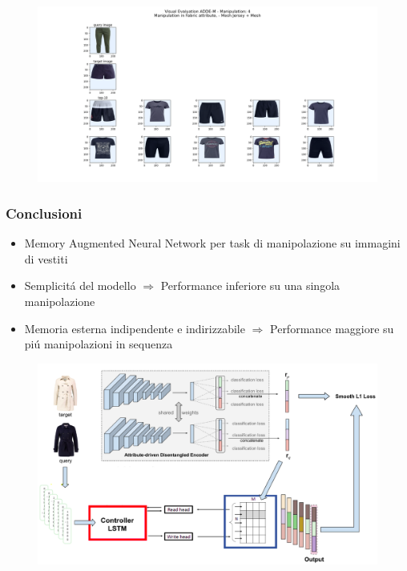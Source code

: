 \documentclass{beamer}
\begin{document}
\begin{frame}
\begin{itemize}
\begin{figure}[!h]
\begin{center}
 			\includegraphics[scale=0.28]{"Immagini/4.8.png"}
 			\end{center}
\end{figure}
\end{itemize}
\end{frame}

\begin{frame}
\frametitle{Conclusioni}
\begin{itemize}
\item Memory Augmented Neural Network per task di manipolazione su immagini di vestiti
\item Semplicit\'a del modello $\Rightarrow$ Performance inferiore su una singola manipolazione
\item Memoria esterna indipendente e indirizzabile $\Rightarrow$ Performance maggiore su pi\'u manipolazioni in sequenza
\end{itemize}
\begin{figure}[!h]
 			\begin{center}
 			\includegraphics[scale=0.20]{"Immagini/All2.png"}
 			\end{center}
\end{figure}
\end{frame}
\end{document}
